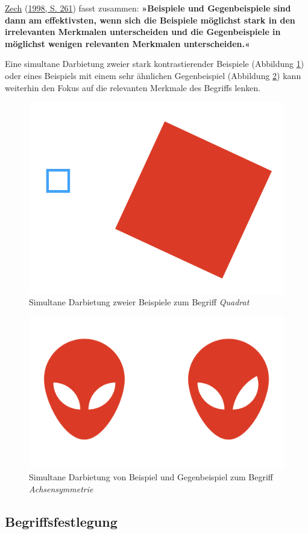 \documentclass[
  ngerman,
]{scrbook}
\theoremstyle{definition}
\theoremstyle{definition}
\theoremstyle{definition}
\theoremstyle{definition}
\theoremstyle{remark}
\begin{document}
\protect\hyperlink{ref-Zech1998}{Zech} (\protect\hyperlink{ref-Zech1998}{1998, S. 261}) fasst zusammen: \textbf{»Beispiele und Gegenbeispiele sind dann am effektivsten, wenn sich die Beispiele möglichst stark in den irrelevanten Merkmalen unterscheiden und die Gegenbeispiele in möglichst wenigen relevanten Merkmalen unterscheiden.«}

Eine simultane Darbietung zweier stark kontrastierender Beispiele (Abbildung \ref{fig:SimultanBeispiel}) oder eines Beispiels mit einem sehr ähnlichen Gegenbeispiel (Abbildung \ref{fig:SimultanGegenbeispiel}) kann weiterhin den Fokus auf die relevanten Merkmale des Begriffs lenken.



\begin{figure}

{\centering \includegraphics[width=0.5\linewidth]{pictures/6-Quadrat} 

}

\caption{Simultane Darbietung zweier Beispiele zum Begriff \emph{Quadrat}}\label{fig:SimultanBeispiel}
\end{figure}



\begin{figure}

{\centering \includegraphics[width=0.4\linewidth]{pictures/6-Achsensymmetrie} 

}

\caption{Simultane Darbietung von Beispiel und Gegenbeispiel zum Begriff \emph{Achsensymmetrie}}\label{fig:SimultanGegenbeispiel}
\end{figure}

\hypertarget{begriffsfestlegung}{%
\subsection{Begriffsfestlegung}\label{begriffsfestlegung}}
\end{document}
